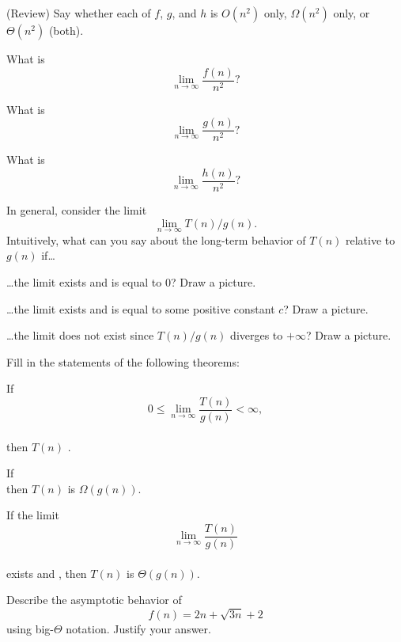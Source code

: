 \documentclass{tufte-handout}
\begin{document}
\begin{questions}
\item (Review) Say whether each of $f$, $g$, and $h$ is $O(n^2)$ only,
  $\Omega(n^2)$ only, or $\Theta(n^2)$ (\ie both).
\item What is \[ \lim_{n \to \infty} \frac{f(n)}{n^2}? \]
\item What is \[ \lim_{n \to \infty} \frac{g(n)}{n^2}? \]
\item What is \[ \lim_{n \to \infty} \frac{h(n)}{n^2}? \]
\item In general, consider the limit \[ \lim_{n \to \infty} T(n)/g(n). \]
  Intuitively, what can you say about the long-term behavior of $T(n)$
  relative to $g(n)$ if\dots
  \begin{subquestions}
    \item \dots the limit exists and is equal to $0$?  Draw a picture.
    \item \dots the limit exists and is equal to some positive
      constant $c$?  Draw a picture.
    \item \dots the limit does not exist since $T(n)/g(n)$ diverges to
      $+\infty$?  Draw a picture.
    \end{subquestions}
\item Fill in the statements of the following theorems:
\begin{thm}
  If \[ 0 \leq \lim_{n \to \infty} \frac{T(n)}{g(n)} < \infty, \]
  \\[2em] then $T(n)$ \uline{\hfill}.
\end{thm} \vspace{0.2in}
\begin{thm}
  If \\[6em] then $T(n)$ is $\Omega(g(n))$.
\end{thm} \vspace{0.2in}
\begin{thm}
  If the limit \[ \lim_{n \to \infty} \frac{T(n)}{g(n)} \] \\[2em]
  exists and \uline{\hfill}, then $T(n)$ is $\Theta(g(n))$.
\end{thm}

\item Describe the asymptotic behavior of \[ f(n) = 2n + \sqrt{3n} + 2 \]
  using big-$\Theta$ notation.  Justify your answer.

\end{questions}
\end{document}
